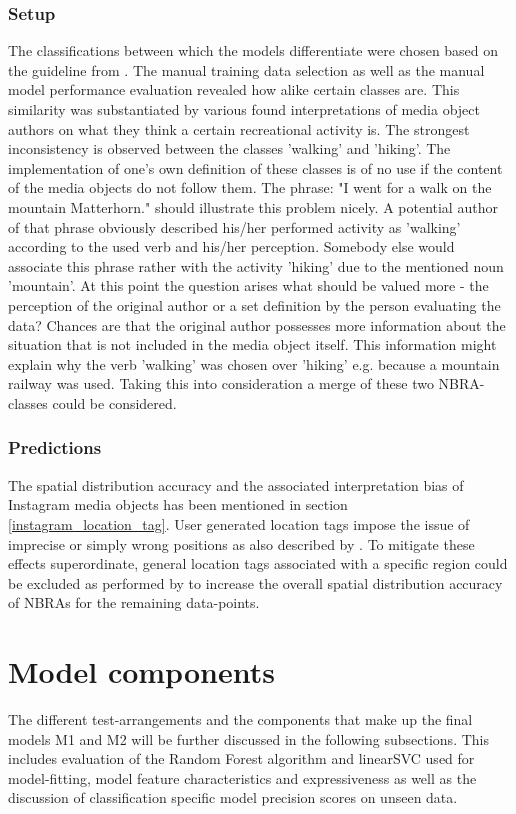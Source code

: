 \subsubsection{Setup} 
The classifications between which the models differentiate were chosen based on the guideline from \textcite{IFL2018}. The manual training data selection as well as the manual model performance evaluation revealed how alike certain classes are. This similarity was substantiated by various found interpretations of media object authors on what they think a certain recreational activity is. The strongest inconsistency is observed between the classes 'walking' and 'hiking'. The implementation of one's own definition of these classes is of no use if the content of the media objects do not follow them. The phrase: "I went for a walk on the mountain Matterhorn." should illustrate this problem nicely. A potential author of that phrase obviously described his/her performed activity as 'walking' according to the used verb and his/her perception. Somebody else would associate this phrase rather with the activity 'hiking' due to the mentioned noun 'mountain'. At this point the question arises what should be valued more - the perception of the original author or a set definition by the person evaluating the data? Chances are that the original author possesses more information about the situation that is not included in the media object itself. This information might explain why the verb 'walking' was chosen over 'hiking' e.g. because a mountain railway was used. 
Taking this into consideration a merge of these two NBRA-classes could be considered.

\subsubsection{Predictions}
The spatial distribution accuracy and the associated interpretation bias of Instagram media objects has been mentioned in section \ref{instagram_location_tag}. User generated location tags impose the issue of imprecise or simply wrong positions as also described by \textcite{Lee2016}. To mitigate these effects superordinate, general location tags associated with a specific region could be excluded as performed by \textcite{Heikinheimo2017} to increase the overall spatial distribution accuracy of NBRAs for the remaining data-points.

\section{Model components} \label{disussion_model_performance}
The different test-arrangements and the components that make up the final models M1 and M2 will be further discussed in the following subsections. This includes evaluation of the Random Forest algorithm and linearSVC used for model-fitting, model feature characteristics and expressiveness as well as the discussion of classification specific model precision scores on unseen data.

